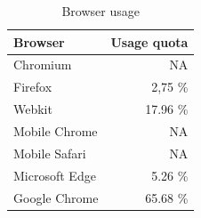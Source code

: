 \documentclass[a4paper, 12pt]{article}
\begin{document}
\begin{table}[!ht]
  \centering
    \begin{tabular}{|l|r|}
      \hline
      \textbf{Browser}  & \textbf{Usage quota} \\ \hline
      Chromium          & NA \\ \hline
      Firefox           & 2,75 \% \\ \hline
      Webkit            & 17.96 \% \\ \hline
      Mobile Chrome     & NA \\ \hline
      Mobile Safari     & NA \\ \hline
      Microsoft Edge    & 5.26 \% \\ \hline
      Google Chrome     & 65.68 \% \\ \hline
    \end{tabular}
  \caption{Browser usage \citep{browserUsage}}
  \label{tab:browserUsage}
\end{table}
\end{document}
